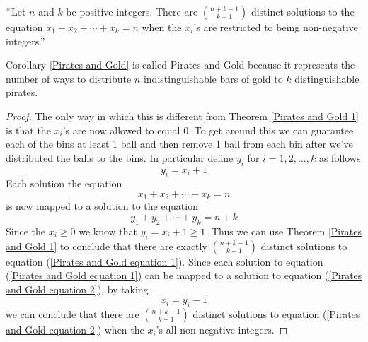         \begin{corollary}
            $``$Let $n$ and $k$ be positive integers. There are $\binom{n + k - 1}{k - 1}$ distinct
            solutions to the equation $x_1 + x_2 + \cdots + x_k = n$ when the $x_i$'s are restricted
            to being non-negative integers.''
            \label{Pirates and Gold}
        \end{corollary}
        \begin{note}
            Corollary \ref{Pirates and Gold} is called Pirates and Gold because it represents
            the number of ways to distribute $n$ indistinguishable bars of gold to $k$
            distinguishable pirates.
        \end{note}
        \begin{proof}
            The only way in which this is different from Theorem \ref{Pirates and Gold 1}
            is that the $x_i$'s are now allowed to equal 0. To get around this we can
            guarantee each of the bins at least 1 ball and then remove 1 ball from each bin
            after we've distributed the balls to the bins. In particular define $y_i$ for
            $i = 1, 2, \dots, k$ as follows
            \begin{equation}
                y_i = x_i + 1
            \end{equation}
            Each solution the equation
            \begin{equation}
                x_1 + x_2 + \cdots + x_k = n
                \label{Pirates and Gold equation 2}
            \end{equation}
            is now mapped to a solution to the equation
            \begin{equation}
                y_1 + y_2 + \cdots + y_k = n + k
                \label{Pirates and Gold equation 1}
            \end{equation}
            Since the $x_i \ge 0$ we know that $y_i = x_i + 1 \ge 1$. Thus we can use Theorem
            \ref{Pirates and Gold 1} to conclude that there are exactly $\binom{n + k - 1}{k - 1}$
            distinct solutions to equation (\ref{Pirates and Gold equation 1}). Since each solution to equation
            (\ref{Pirates and Gold equation 1}) can be mapped to a solution to equation
            (\ref{Pirates and Gold equation 2}), by taking
            \begin{equation}
                x_i = y_i - 1
            \end{equation}
            we can conclude that there are $\binom{n + k - 1}{k - 1}$ distinct solutions
            to equation (\ref{Pirates and Gold equation 2}) when the $x_i$'s all non-negative
            integers. \QED
        \end{proof}
